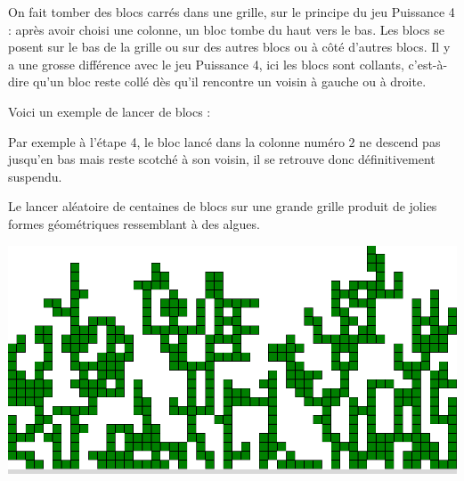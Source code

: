 \documentclass[11pt,class=report,crop=false]{standalone}
\begin{document}
\begin{cours}
On fait tomber des blocs carrés dans une grille, sur le principe du jeu \og{}Puissance 4\fg{} : après avoir choisi une colonne, un bloc tombe du haut vers le bas. Les blocs se posent sur le bas de la grille ou sur des autres blocs ou à côté d'autres blocs. Il y a une grosse différence avec le jeu \og{}Puissance 4\fg{}, ici les blocs sont \og{}collants\fg{}, c'est-à-dire qu'un bloc reste collé dès qu'il rencontre un voisin à gauche ou à droite.


Voici un exemple de lancer de blocs :

Par exemple à l'étape 4, le bloc lancé dans la colonne numéro $2$ ne descend pas jusqu'en bas mais reste \og{}scotché\fg{} à son voisin, il se retrouve donc définitivement suspendu.

Le lancer aléatoire de centaines de blocs sur une grande grille produit de jolies formes géométriques ressemblant à des algues.

\begin{center}
\includegraphics[scale=\myscale,scale=0.3]{ecran-alea-bloc0}
\end{center}

\end{cours}



\end{document}
